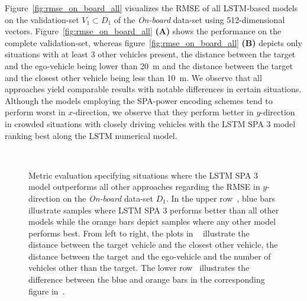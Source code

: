 Figure~\ref{fig:rmse_on_board_all} visualizes the \ac{RMSE} of all \ac{LSTM}-based models on the validation-set $V_1 \subset D_1$ of the \emph{On-board} data-set using \num{512}-dimensional vectors.
Figure~\ref{fig:rmse_on_board_all} \textbf{(A)} shows the performance on the complete validation-set, whereas figure~\ref{fig:rmse_on_board_all} \textbf{(B)} depicts only situations with at least \num{3} other vehicles present, the distance between the target and the ego-vehicle being lower than \SI{20}{\meter} and the distance between the target and the closest other vehicle being less than \SI{10}{\meter}.
We observe that all approaches yield comparable results with notable differences in certain situations.
Although the models employing the \ac{SPA}-power encoding schemes tend to perform worst in $x$-direction, we observe that they perform better in $y$-direction in crowded situations with closely driving vehicles with the \acs{LSTM} \acs{SPA} \num{3} model ranking best along the \acs{LSTM} numerical model.
\begin{figure}[t!]
    \centering
    \\
    \caption{Metric evaluation specifying situations where the \ac{LSTM} \acs{SPA} \num{3} model outperforms all other approaches regarding the \acs{RMSE} in $y$-direction on the \emph{On-board} data-set $D_1$.
      In the upper row~\protect{}, blue bars illustrate samples where \ac{LSTM} \ac{SPA} \num{3} performs better than all other models while the orange bars depict samples where any other model performs best.
      From left to right, the plots in ~\protect{} illustrate the distance between the target vehicle and the closest other vehicle, the distance between the target and the ego-vehicle and the number of vehicles other than the target.
      The lower row~\protect{} illustrates the difference between the blue and orange bars in the corresponding figure in~\protect{}.
    }
    \label{fig:histograms_on_board}
\end{figure}

